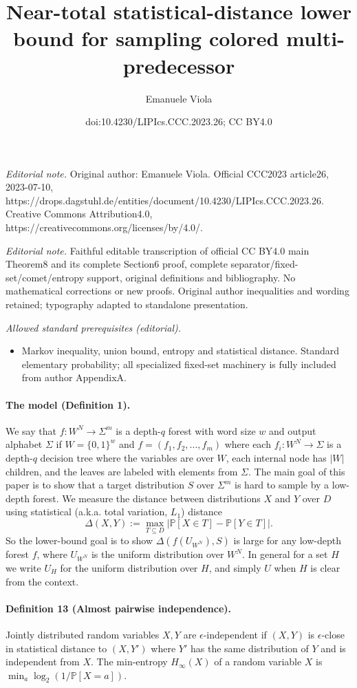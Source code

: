 \documentclass[10pt,a4paper]{article}
\title{Near-total statistical-distance lower bound for sampling colored multi-predecessor}
\author{Emanuele Viola}
\date{doi:10.4230/LIPIcs.CCC.2023.26; CC BY4.0}
\begin{document}
\maketitle
\noindent\textit{Editorial note.} Original author: Emanuele Viola. Official CCC2023 article26, 2023-07-10, https://drops.dagstuhl.de/entities/document/10.4230/LIPIcs.CCC.2023.26. Creative Commons Attribution4.0, https://creativecommons.org/licenses/by/4.0/.\par\medskip
\noindent\textit{Editorial note.} Faithful editable transcription of official CC BY4.0 main Theorem8 and its complete Section6 proof, complete separator/fixed-set/comet/entropy support, original definitions and bibliography. No mathematical corrections or new proofs. Original author inequalities and wording retained; typography adapted to standalone presentation.\par\medskip
\noindent\textit{Allowed standard prerequisites (editorial).}\begin{itemize}
\item Markov inequality, union bound, entropy and statistical distance. Standard elementary probability; all specialized fixed-set machinery is fully included from author AppendixA.
\end{itemize}\medskip
\paragraph{The model (Definition 1).}
We say that $f:W^N\to\Sigma^m$ is a depth-$q$ forest with word size $w$ and output alphabet $\Sigma$ if $W=\{0,1\}^w$ and $f=(f_1,f_2,\ldots,f_m)$ where each $f_i:W^N\to\Sigma$ is a depth-$q$ decision tree where the variables are over $W$, each internal node has $|W|$ children, and the leaves are labeled with elements from $\Sigma$.
The main goal of this paper is to show that a target distribution $S$ over $\Sigma^m$ is hard to sample by a low-depth forest. We measure the distance between distributions $X$ and $Y$ over $D$ using statistical (a.k.a. total variation, $L_1$) distance
\[\Delta(X,Y):=\max_{T\subseteq D}|\mathbb P[X\in T]-\mathbb P[Y\in T]|.\]
So the lower-bound goal is to show $\Delta(f(U_{W^N}),S)$ is large for any low-depth forest $f$, where $U_{W^N}$ is the uniform distribution over $W^N$. In general for a set $H$ we write $U_H$ for the uniform distribution over $H$, and simply $U$ when $H$ is clear from the context.
\paragraph{Definition 13 (Almost pairwise independence).}
Jointly distributed random variables $X,Y$ are $\epsilon$-independent if $(X,Y)$ is $\epsilon$-close in statistical distance to $(X,Y')$ where $Y'$ has the same distribution of $Y$ and is independent from $X$.
The min-entropy $H_\infty(X)$ of a random variable $X$ is $\min_a\log_2(1/\mathbb P[X=a])$.
\end{document}
